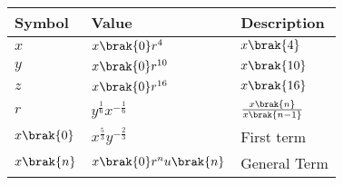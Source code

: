 \begin{tabular}{|m{2cm}|m{2cm}|m{2cm}|}
    \hline
    \textbf{Symbol} & \textbf{Value} & \textbf{Description}\\ [1ex]
    \hline
        $x$ & $x\brak{0}r^4$ & $x\brak{4}$ \\ [1ex]
    \hline
        $y$ & $x\brak{0}r^{10}$ & $x\brak{10}$\\ [1ex]
    \hline
        $z$ & $x\brak{0}r^{16}$ & $x\brak{16}$\\ [1ex]
    \hline
        $r$ & $y^{\frac{1}{6}}x^{-\frac{1}{6}}$ & $\frac{x\brak{n}}{x\brak{n-1}}$\\[1ex]
    \hline \vspace{0.1cm}
        $x\brak{0}$ & $x^{\frac{5}{3}}y^{-\frac{2}{3}}$ & First term \\[1ex]
    \hline
        $x\brak{n}$ & $x\brak{0}r^nu\brak{n}$ & General Term \\ [1ex]
    \hline
    \end{tabular}
